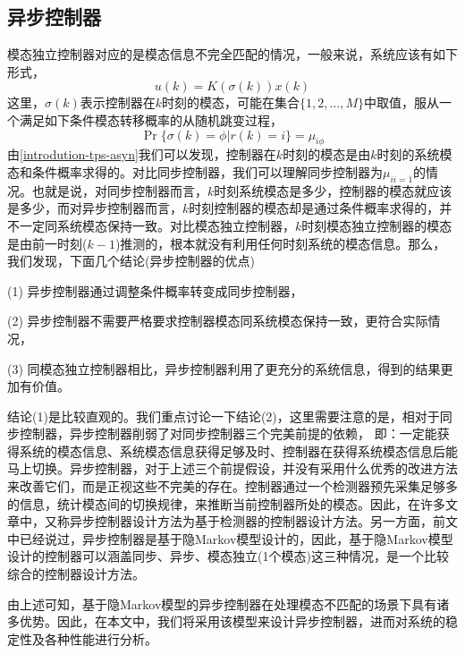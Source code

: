 	\subsection{异步控制器}
	模态独立控制器对应的是模态信息不完全匹配的情况，一般来说，系统应该有如下形式，
	\begin{equation}
	u(k)=K(\sigma(k))x(k)
	\end{equation}
	这里，$\sigma(k)$表示控制器在$k$时刻的模态，可能在集合$\{1,2,\dots,M\}$中取值，服从一个满足如下条件模态转移概率的从随机跳变过程，
	\begin{equation}\label{introdution-tps-asyn}
	\Pr\{\sigma(k)=\phi|r(k)=i \}=\mu_{i\phi}
	\end{equation}
	由\eqref{introdution-tps-asyn}我们可以发现，控制器在$k$时刻的模态是由$k$时刻的系统模态和条件概率求得的。对比同步控制器，我们可以理解同步控制器为$\mu_{ii=1}$的情况。也就是说，对同步控制器而言，$k$时刻系统模态是多少，控制器的模态就应该是多少，而对异步控制器而言，$k$时刻控制器的模态却是通过条件概率求得的，并不一定同系统模态保持一致。对比模态独立控制器，$k$时刻模态独立控制器的模态是由前一时刻($k-1$)推测的，根本就没有利用任何时刻系统的模态信息。那么，我们发现，下面几个结论(异步控制器的优点)
		
		(1) 异步控制器通过调整条件概率转变成同步控制器，
		
		(2) 异步控制器不需要严格要求控制器模态同系统模态保持一致，更符合实际情况，
		
		(3) 同模态独立控制器相比，异步控制器利用了更充分的系统信息，得到的结果更加有价值。
		
		结论(1)是比较直观的。我们重点讨论一下结论(2)，这里需要注意的是，相对于同步控制器，异步控制器削弱了对同步控制器三个完美前提的依赖， 即：一定能获得系统的模态信息、系统模态信息获得足够及时、控制器在获得系统模态信息后能马上切换。异步控制器，对于上述三个前提假设，并没有采用什么优秀的改进方法来改善它们，而是正视这些不完美的存在。控制器通过一个检测器预先采集足够多的信息，统计模态间的切换规律，来推断当前控制器所处的模态。因此，在许多文章中，又称异步控制器设计方法为基于检测器的控制器设计方法。另一方面，前文中已经说过，异步控制器是基于隐Markov模型设计的，因此，基于隐Markov模型设计的控制器可以涵盖同步、异步、模态独立(1个模态)这三种情况，是一个比较综合的控制器设计方法。
		
		由上述可知，基于隐Markov模型的异步控制器在处理模态不匹配的场景下具有诸多优势。因此，在本文中，我们将采用该模型来设计异步控制器，进而对系统的稳定性及各种性能进行分析。
	
